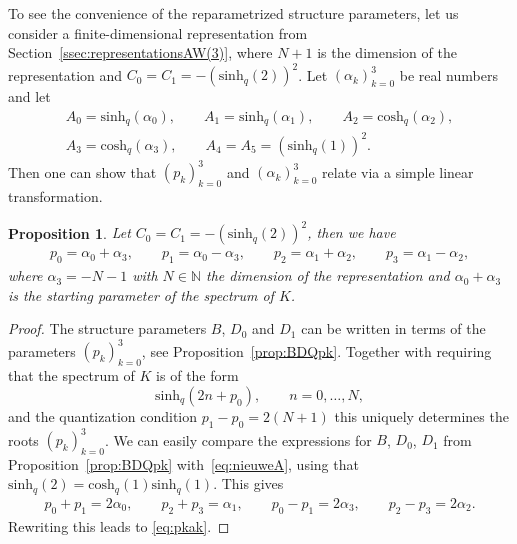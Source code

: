 \documentclass[10pt,a4paper]{amsart}
\numberwithin{equation}{section}
\newtheorem{Proposition}[Theorem]{Proposition}
 { \theoremstyle{definition}
\newtheorem{Definition}[Theorem]{Definition}
\newtheorem{Note}[Theorem]{Note}
\newtheorem{Example}[Theorem]{Example}
\newtheorem{Remark}[Theorem]{Remark} }
\newcommand{\NN}{\mathbb{N}}
\newcommand{\chq}{\mathrm{cosh}_q}
\newcommand{\shq}{\mathrm{sinh}_q}
\begin{document}
To see the convenience of the reparametrized structure parameters, let us consider a finite-dimensional representation from Section~\ref{ssec:representationsAW(3)}, where $N+1$ is the dimension of the representation and $C_0=C_1=-(\shq(2))^2$. Let $(\alpha_k)_{k=0}^3$ be real numbers and let
\begin{gather}
		A_0=\shq(\alpha_0),\qquad A_1=\shq(\alpha_1),\qquad A_2=\chq(\alpha_2),\nonumber\\
A_3=\chq(\alpha_3), \qquad A_4=A_5=(\shq(1))^2.\label{eq:Aalpha}
\end{gather}
Then one can show that $(p_k)_{k=0}^3$ and $(\alpha_k)_{k=0}^3$ relate via a simple linear transformation.
\begin{Proposition}
	Let $C_0=C_1=-(\shq(2))^2$, then we have 	
	\begin{gather}
		p_0=\alpha_0+\alpha_3,\qquad p_1=\alpha_0-\alpha_3,\qquad p_2=\alpha_1+\alpha_2,\qquad p_3=\alpha_1 -\alpha_2,\label{eq:pkak}
	\end{gather}
where $\alpha_3=-N-1$ with $N\in\NN$ the dimension of the representation and $\alpha_0+\alpha_3$ is the starting parameter of the spectrum of $K$.
\end{Proposition}
\begin{proof}
The structure parameters $B$, $D_0$ and $D_1$ can be written in terms of the parameters $(p_k)_{k=0}^3$, see Proposition~\ref{prop:BDQpk}. Together with requiring that the spectrum of $K$ is of the form
	\[
	\shq(2n+p_0),\qquad n=0,\ldots,N,
	\]
	and the quantization condition $p_1-p_0=2(N+1)$ this uniquely determines the roots $(p_k)_{k=0}^3$. We can easily compare the expressions for $B$, $D_0$, $D_1$ from Proposition~\ref{prop:BDQpk} with~\eqref{eq:nieuweA}, using that $\shq(2)=\chq(1)\shq(1)$. This gives
	\begin{gather*}
		p_0+p_1=2\alpha_0,\qquad p_2+p_3=\alpha_1,\qquad p_0-p_1=2\alpha_3,\qquad p_2-p_3=2\alpha_2.
	\end{gather*}
	Rewriting this leads to \eqref{eq:pkak}.
\end{proof}
\end{document}
